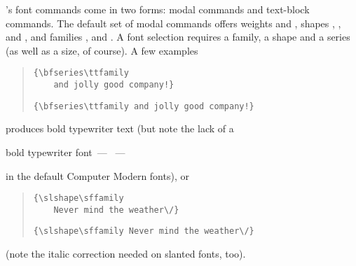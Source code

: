 \LaTeXe{}'s font commands come in two forms: modal commands and
text-block commands.  The default set of modal commands offers weights
 and , shapes ,
,  and , and families
,  and .  A font selection
requires a family, a shape and a series (as well as a size, of
course).  A few examples
\begin{quote}
\begin{narrowversion}
\begin{verbatim}
{\bfseries\ttfamily
    and jolly good company!}
\end{verbatim}
\end{narrowversion}
\begin{wideversion}
\begin{verbatim}
{\bfseries\ttfamily and jolly good company!}
\end{verbatim}
\end{wideversion}
\end{quote}
produces bold typewriter text (but note the lack of a %
\begin{narrowversion} %
  bold typewriter font~--- ~---
\end{narrowversion}
\begin{wideversion}
\end{wideversion}
in the default Computer Modern fonts), or
\begin{quote}
\begin{narrowversion}
\begin{verbatim}
{\slshape\sffamily
    Never mind the weather\/}
\end{verbatim}
\end{narrowversion}
\begin{wideversion}
\begin{verbatim}
{\slshape\sffamily Never mind the weather\/}
\end{verbatim}
\end{wideversion}
\end{quote}
(note the italic correction needed on slanted fonts, too).

